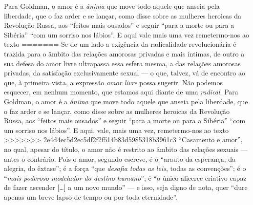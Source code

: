 {Para Goldman, o amor é a \emph{ânima} que
move todo aquele que anseia pela liberdade, que o faz arder e se lançar,
como disse sobre as mulheres heroicas da Revolução Russa, aos ``feitos
mais ousados'' ​​e seguir ``para a morte ou para a Sibéria'' ``com um
sorriso nos lábios''. E aqui vale mais uma vez remetermo-nos ao texto
=======
Se de um lado a exigência da radicalidade revolucionária é trazida para
o âmbito das relações amorosas privadas e mais íntimas, de outro a sua
defesa do amor livre ultrapassa essa esfera mesma, a das relações
amorosas privadas, da satisfação exclusivamente sexual --- o que, talvez,
vá de encontro ao que, à primeira vista, a expressão \textit{amor livre}
possa sugerir. Não podemos esquecer, em nenhum momento, que estamos aqui
diante de uma \textit{radical}. Para Goldman, o amor é a \textit{ânima} que
move todo aquele que anseia pela liberdade, que o faz arder e se lançar,
como disse sobre as mulheres heroicas da Revolução Russa, aos ``feitos
mais ousados'' ​​e seguir ``para a morte ou para a Sibéria'' ``com um
sorriso nos lábios''. E aqui, vale, mais uma vez, remetermo-nos ao texto
>>>>>>> 2e4d4ec5d2ec5df2f2f514b83d5985318b3961c3
``Casamento e amor'', no qual, apesar do título, o amor não é
restrito ao âmbito das relações sexuais --- antes o contrário. Pois o
amor, segundo escreve, é o ``arauto da esperança, da alegria, do
êxtase''; é a força ``que \textit{desafia todas as leis}, todas as
convenções''; é o ``\textit{mais poderoso modelador do destino humano}'';
é ``o único alicerce criativo capaz de fazer ascender {[}\ldots{]} a um
novo mundo'' --- e isso, seja digno de nota, quer ``dure apenas um breve
lapso de tempo ou por toda eternidade''. 

}
